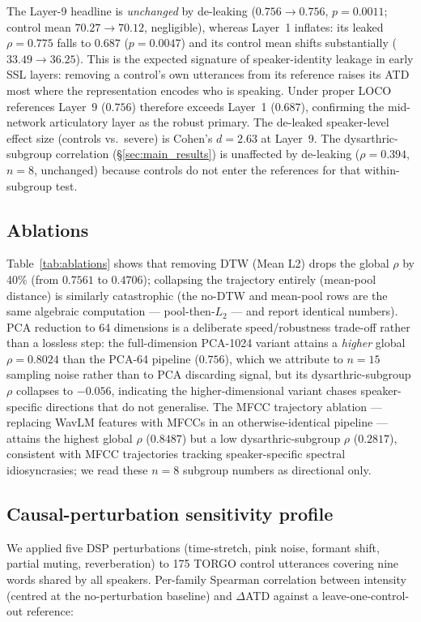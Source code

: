 The Layer-9 headline is \emph{unchanged} by de-leaking
($0.756 \to 0.756$, $p = 0.0011$; control mean $70.27 \to 70.12$,
negligible), whereas Layer~1 inflates: its leaked $\rho = 0.775$ falls to
$0.687$ ($p = 0.0047$) and its control mean shifts substantially
($33.49 \to 36.25$). This is the expected signature of speaker-identity
leakage in early SSL layers: removing a control's own utterances from its
reference raises its ATD most where the representation encodes who is
speaking. Under proper LOCO references Layer~9 ($0.756$) therefore exceeds
Layer~1 ($0.687$), confirming the mid-network articulatory layer as the
robust primary. The de-leaked speaker-level effect size (controls vs.\
severe) is Cohen's $d = 2.63$ at Layer~9. The dysarthric-subgroup
correlation (\S\ref{sec:main_results}) is unaffected by de-leaking
($\rho = 0.394$, $n = 8$, unchanged) because controls do not enter the
references for that within-subgroup test.

\subsection{Ablations}
Table~\ref{tab:ablations} shows that removing DTW (Mean L2) drops the
global $\rho$ by 40\% (from $0.7561$ to $0.4706$); collapsing the
trajectory entirely (mean-pool distance) is similarly catastrophic
(the no-DTW and mean-pool rows are the same algebraic computation ---
pool-then-$L_2$ --- and report identical numbers). PCA reduction to 64
dimensions is a deliberate speed/robustness trade-off rather than a
lossless step: the full-dimension PCA-1024 variant attains a
\emph{higher} global $\rho = 0.8024$ than the PCA-64 pipeline
($0.756$), which we attribute to $n = 15$ sampling noise rather than to
PCA discarding signal, but its dysarthric-subgroup $\rho$ collapses to
$-0.056$, indicating the higher-dimensional variant chases
speaker-specific directions that do not generalise. The MFCC trajectory
ablation --- replacing WavLM features with MFCCs in an
otherwise-identical pipeline --- attains the highest global $\rho$
($0.8487$) but a low dysarthric-subgroup $\rho$ ($0.2817$), consistent
with MFCC trajectories tracking speaker-specific spectral idiosyncrasies;
we read these $n = 8$ subgroup numbers as directional only.

\subsection{Causal-perturbation sensitivity profile}
We applied five DSP perturbations (time-stretch, pink noise, formant
shift, partial muting, reverberation) to 175 TORGO control utterances
covering nine words shared by all speakers. Per-family Spearman
correlation between intensity (centred at the no-perturbation baseline)
and $\Delta$ATD against a leave-one-control-out reference:

